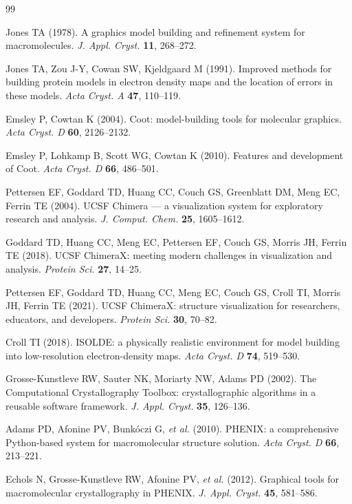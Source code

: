 \documentclass[11pt]{article}
\begin{document}
\begin{thebibliography}{99}

 Jones TA (1978). A graphics model building and refinement
system for macromolecules. \emph{J. Appl. Cryst.} \textbf{11}, 268--272.

 Jones TA, Zou J-Y, Cowan SW, Kjeldgaard M (1991). Improved
methods for building protein models in electron density maps and the location
of errors in these models. \emph{Acta Cryst. A} \textbf{47}, 110--119.

 Emsley P, Cowtan K (2004). Coot: model-building tools for
molecular graphics. \emph{Acta Cryst. D} \textbf{60}, 2126--2132.

 Emsley P, Lohkamp B, Scott WG, Cowtan K (2010). Features
and development of Coot. \emph{Acta Cryst. D} \textbf{66}, 486--501.

 Pettersen EF, Goddard TD, Huang CC, Couch GS,
Greenblatt DM, Meng EC, Ferrin TE (2004). UCSF Chimera --- a visualization
system for exploratory research and analysis. \emph{J. Comput. Chem.}
\textbf{25}, 1605--1612.

 Goddard TD, Huang CC, Meng EC, Pettersen EF, Couch GS,
Morris JH, Ferrin TE (2018). UCSF ChimeraX: meeting modern challenges in
visualization and analysis. \emph{Protein Sci.} \textbf{27}, 14--25.

 Pettersen EF, Goddard TD, Huang CC, Meng EC, Couch GS,
Croll TI, Morris JH, Ferrin TE (2021). UCSF ChimeraX: structure visualization
for researchers, educators, and developers. \emph{Protein Sci.} \textbf{30},
70--82.

 Croll TI (2018). ISOLDE: a physically realistic
environment for model building into low-resolution electron-density maps.
\emph{Acta Cryst. D} \textbf{74}, 519--530.

 Grosse-Kunstleve RW, Sauter NK, Moriarty NW, Adams PD
(2002). The Computational Crystallography Toolbox: crystallographic
algorithms in a reusable software framework. \emph{J. Appl. Cryst.}
\textbf{35}, 126--136.

 Adams PD, Afonine PV, Bunk\'oczi G, \emph{et al.} (2010).
PHENIX: a comprehensive Python-based system for macromolecular structure
solution. \emph{Acta Cryst. D} \textbf{66}, 213--221.

 Echols N, Grosse-Kunstleve RW, Afonine PV,
\emph{et al.} (2012). Graphical tools for macromolecular crystallography in
PHENIX. \emph{J. Appl. Cryst.} \textbf{45}, 581--586.


\end{thebibliography}
\end{document}
